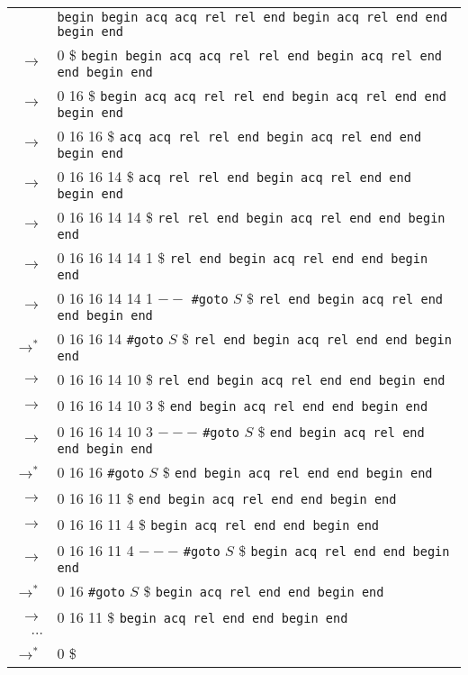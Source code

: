 \documentclass{article}
\begin{document}
\begin{enumerate}
\begin{tabular}{rl}
	         & \texttt{begin begin acq acq rel rel end begin acq rel end end begin end}                     \\
	   $\to$ & 0 \$ \texttt{begin begin acq acq rel rel end begin acq rel end end begin end}                \\
	   $\to$ & 0 16 \$ \texttt{begin acq acq rel rel end begin acq rel end end begin end}                   \\
	   $\to$ & 0 16 16 \$ \texttt{acq acq rel rel end begin acq rel end end begin end}                      \\
	   $\to$ & 0 16 16 14 \$ \texttt{acq rel rel end begin acq rel end end begin end}                       \\
	   $\to$ & 0 16 16 14 14 \$ \texttt{rel rel end begin acq rel end end begin end}                        \\
	   $\to$ & 0 16 16 14 14 1 \$ \texttt{rel end begin acq rel end end begin end}                          \\
	   $\to$ & 0 16 16 14 14 1 $--$ \texttt{\#goto} $S$ \$ \texttt{rel end begin acq rel end end begin end} \\
	 $\to^*$ & 0 16 16 14 \texttt{\#goto} $S$ \$ \texttt{rel end begin acq rel end end begin end}           \\
	   $\to$ & 0 16 16 14 10 \$ \texttt{rel end begin acq rel end end begin end}                            \\
	   $\to$ & 0 16 16 14 10 3 \$ \texttt{end begin acq rel end end begin end}                              \\
	   $\to$ & 0 16 16 14 10 3 $---$ \texttt{\#goto} $S$ \$ \texttt{end begin acq rel end end begin end}    \\
	 $\to^*$ & 0 16 16 \texttt{\#goto} $S$ \$ \texttt{end begin acq rel end end begin end}                  \\
	   $\to$ & 0 16 16 11 \$ \texttt{end begin acq rel end end begin end}                                   \\
	   $\to$ & 0 16 16 11 4 \$ \texttt{begin acq rel end end begin end}                                     \\
	   $\to$ & 0 16 16 11 4 $---$ \texttt{\#goto} $S$ \$ \texttt{begin acq rel end end begin end}           \\
	 $\to^*$ & 0 16 \texttt{\#goto} $S$ \$ \texttt{begin acq rel end end begin end}                         \\
	   $\to$ & 0 16 11 \$ \texttt{begin acq rel end end begin end}                                          \\
	$\cdots$ &\\
     $\to^*$ & 0 \$
\end{tabular}


\end{enumerate}
\end{document}
